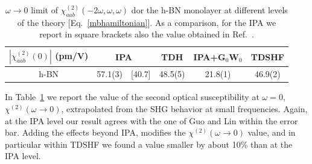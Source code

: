 

\begin{center}
\begin{table}[h]
\small
\begin{tabular}{c|cc|c|c|c}
\hline
$|\chi^{(2)}_{aab} (0)| $ (pm/V) & \multicolumn{2}{c|}{IPA} & TDH & IPA+G$_0$W$_0$ & TDSHF  \\
\hline
 h-BN &  57.1(3)  & [40.7] & 48.5(5) &  21.8(1)  & 46.9(2)  \\
\hline
\end{tabular}
\caption{$\omega\rightarrow 0$ limit of $\chi^{(2)}_{aab} (-2\omega,\omega,\omega)$ dor the h-BN monolayer at different levels of the theory [Eq.~\eqref{mbhamiltonian}]. As a comparison, for the IPA we report in square brackets also the value obtained in Ref.~\cite{guo2005second}.\label{tab1}}  
\end{table}
\end{center} 

In  Table~\ref{tab1} we report  the value of the second optical susceptibility at $\omega=0$, $\chi^{(2)}(\omega \to 0)$, extrapolated from the SHG  behavior at small frequencies.    
Again, at the IPA level our result agrees with the one of Guo and Lin\cite{guo2005second} within the error bar. Adding the effects beyond IPA, modifies the $\chi^{(2)}(\omega \to 0)$ value, and in particular within TDSHF we found a value smaller by about 10\% than at the IPA level.

